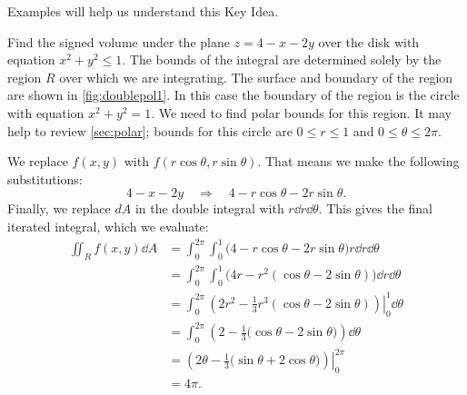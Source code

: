 
Examples will help us understand this Key Idea.

\begin{example}\label{ex_doublepol1}
Find the signed volume under the plane $z=4-x-2y$ over the disk with equation $x^2+y^2\le1$.
\solution
{}%
%
The bounds of the integral are determined solely by the region $R$ over which we are integrating. The surface and boundary of the region are shown in \autoref{fig:doublepol1}. In this case the boundary of the region is the circle with equation $x^2+y^2=1$. We need to find polar bounds for this region. It may help to review \autoref{sec:polar}; bounds for this circle are $0\leq r\leq 1$ and $0\leq \theta\leq 2\pi$.

We replace $f(x,y)$ with $f(r\cos\theta,r\sin\theta)$. That means we make the following substitutions:
\[4-x-2y \quad \Rightarrow \quad 4-r\cos\theta-2r\sin\theta.\]
Finally, we replace $dA$ in the double integral with $r\dd r\dd\theta$. This gives the final iterated integral, which we evaluate:
\begin{align*}
\iint_Rf(x,y)\dd A
 &= \int_0^{2\pi}\int_0^1\bigl(4-r\cos\theta-2r\sin\theta\bigr)r\dd r\dd\theta\\
 &= \int_0^{2\pi}\int_0^1\bigl(4r-r^2(\cos\theta-2\sin\theta)\bigr)\dd r\dd\theta\\
 &= \int_0^{2\pi}\left.\left(2r^2-\frac13r^3(\cos\theta-2\sin\theta)\right)\right|_0^1\dd\theta\\
 &= \int_0^{2\pi} \left(2-\frac13\bigl(\cos\theta-2\sin\theta\bigr)\right)\dd\theta\\
 &= \left.\left(2\theta -\frac13\bigl(\sin\theta+2\cos\theta\bigr)\right)\right|_0^{2\pi} \\
 &= 4\pi %
 .
\end{align*}
\end{example}

